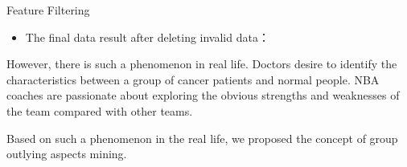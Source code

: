 \documentclass[
 size=14pt,
 paper=smartboard,  %
 mode=present, 		%
 display=slides, 	%
 style=tuliplab,  	%
 pauseslide,
 fleqn,leqno]{powerdot}
\begin{document}
\begin{slide}[toc=,bm=]{Feature Filtering}

\begin{itemize}
\item
The final data result after deleting invalid data：
\end{itemize}


\begin{table}[]
\setlength{\abovecaptionskip}{0pt}
\setlength{\belowcaptionskip}{10pt}
\setlength{\tabcolsep}{10pt} %
\renewcommand{\arraystretch}{1.5} %
\centering
\caption{Dataset description}
\end{table}

\begin{note}
However,
there is such a phenomenon in real life.
Doctors desire to identify the characteristics between
a group of cancer patients and normal people.
NBA coaches are passionate about exploring the obvious strengths and
weaknesses of the team compared with other teams.

Based on such a phenomenon in the real life,
we proposed the concept of group outlying aspects mining.
\end{note}
\end{slide}
\end{document}
